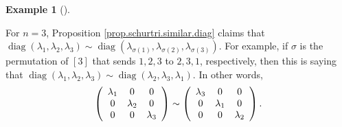 \documentclass[numbers=enddot,12pt,final,onecolumn,notitlepage]{scrartcl}%
\numberwithin{exer}{subsection}
\theoremstyle{definition}
\newtheorem{exam}[theo]{Example}
\newenvironment{example}[1][]
{\begin{exam}[#1]\begin{leftbar}}
{\end{leftbar}\end{exam}}
\begin{document}
\begin{example}
For $n=3$, Proposition \ref{prop.schurtri.similar.diag} claims that
$\operatorname*{diag}\left(  \lambda_{1},\lambda_{2},\lambda_{3}\right)
\sim\operatorname*{diag}\left(  \lambda_{\sigma\left(  1\right)  }%
,\lambda_{\sigma\left(  2\right)  },\lambda_{\sigma\left(  3\right)  }\right)
$. For example, if $\sigma$ is the permutation of $\left[  3\right]  $ that
sends $1,2,3$ to $2,3,1$, respectively, then this is saying that
$\operatorname*{diag}\left(  \lambda_{1},\lambda_{2},\lambda_{3}\right)
\sim\operatorname*{diag}\left(  \lambda_{2},\lambda_{3},\lambda_{1}\right)  $.
In other words,%
\[
\left(
\begin{array}
[c]{ccc}%
\lambda_{1} & 0 & 0\\
0 & \lambda_{2} & 0\\
0 & 0 & \lambda_{3}%
\end{array}
\right)  \sim\left(
\begin{array}
[c]{ccc}%
\lambda_{3} & 0 & 0\\
0 & \lambda_{1} & 0\\
0 & 0 & \lambda_{2}%
\end{array}
\right)  .
\]

\end{example}
\end{document}

